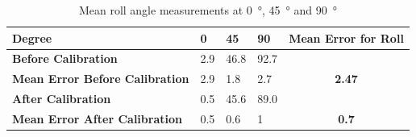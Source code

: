 \documentclass[12pt]{article}
\begin{document}
\begin{table}[!h]
\centering
\caption{Mean roll angle measurements at \SI{0}{\degree}, \SI{45}{\degree} and \SI{90}{\degree}}
\label{Table_acc_roll}
\begin{tabular}{lllll}
\hline
\textbf{Degree}                                                                                                                                                                                                             & \textbf{0} & \textbf{45} & \textbf{90} & \textbf{Mean Error for Roll}
\\ \hline
\textbf{Before Calibration}                                                                                                                                                                                                         & 2.9 & 46.8 & 92.7
\\ \hline
\textbf{Mean Error Before Calibration}                                                                                                                                                                                                             & 2.9 & 1.8 & 2.7 & \multicolumn{1}{c}{\textbf{2.47}}
\\ \hline
\textbf{After	 Calibration}                                                                                                                                                                                                              & 0.5 & 45.6 & 89.0
\\ \hline
\textbf{Mean Error After Calibration}                                                                                                                                                                                                             & 0.5 & 0.6 & 1 & \multicolumn{1}{c}{\textbf{0.7}}
\\ \hline
\end{tabular}
\end{table}
\end{document}
